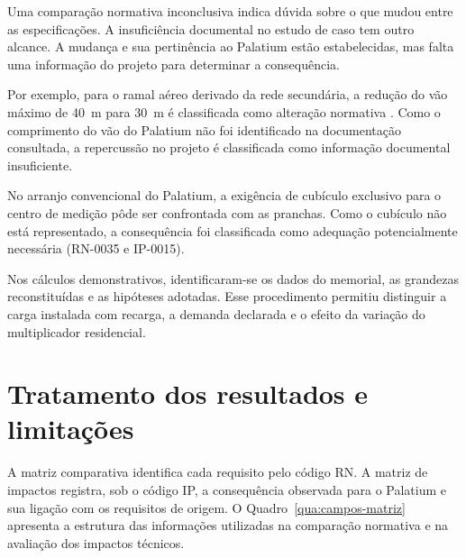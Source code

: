 Uma comparação normativa inconclusiva indica dúvida sobre o que mudou entre as especificações. A insuficiência documental no estudo de caso tem outro alcance. A mudança e sua pertinência ao Palatium estão estabelecidas, mas falta uma informação do projeto para determinar a consequência.

Por exemplo, para o ramal aéreo derivado da rede secundária, a redução do vão máximo de 40~m para 30~m é classificada como alteração normativa \cite[item~7.6.1.3, alínea~b]{enel0126}\cite[item~7.16.3, alínea~c]{enel1580}. Como o comprimento do vão do Palatium não foi identificado na documentação consultada, a repercussão no projeto é classificada como informação documental insuficiente.

No arranjo convencional do Palatium, a exigência de cubículo exclusivo para o centro de medição pôde ser confrontada com as pranchas. Como o cubículo não está representado, a consequência foi classificada como adequação potencialmente necessária (RN-0035 e IP-0015).

Nos cálculos demonstrativos, identificaram-se os dados do memorial, as grandezas reconstituídas e as hipóteses adotadas. Esse procedimento permitiu distinguir a carga instalada com recarga, a demanda declarada e o efeito da variação do multiplicador residencial.

\section{Tratamento dos resultados e limitações}
\label{sec:limitacoes}

A matriz comparativa identifica cada requisito pelo código RN. A matriz de impactos registra, sob o código IP, a consequência observada para o Palatium e sua ligação com os requisitos de origem. O Quadro~\ref{qua:campos-matriz} apresenta a estrutura das informações utilizadas na comparação normativa e na avaliação dos impactos técnicos.

